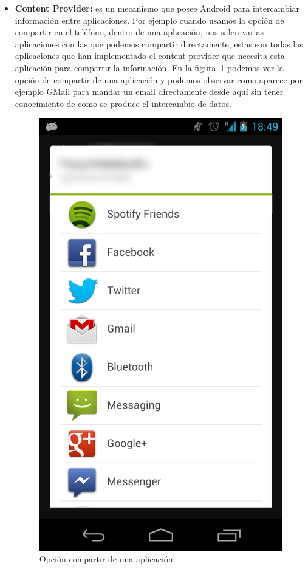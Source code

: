 \begin{itemize}
\item \textbf{Content Provider:} es un mecanismo que posee Android para intercambiar información entre aplicaciones. Por ejemplo cuando usamos la opción de compartir en el teléfono, dentro de una aplicación, nos salen varias aplicaciones con las que podemos compartir directamente, estas son todas las aplicaciones que han implementado el content provider que necesita esta aplicación para compartir la información. En la figura~\ref{fig:contentProvider} podemos ver la opción de compartir de una aplicación y podemos observar como aparece por ejemplo GMail para mandar un email directamente desde aquí sin tener conocimiento de como se produce el intercambio de datos.
 
\begin{figure}[h]
  \centering
    \includegraphics[scale=0.2]{./Android/imagenes/contentProvider.png}
  \caption{Opción compartir de una aplicación.}
  \label{fig:contentProvider}
\end{figure}


\end{itemize}
